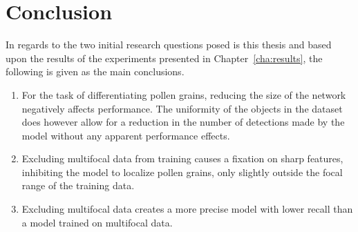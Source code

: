 \chapter{Conclusion}\label{cha:conclusion}


In regards to the two initial research questions posed is this thesis and based upon the results of the experiments presented in Chapter~\ref{cha:results}, the following is given as the main conclusions.

\begin{enumerate}
    \item For the task of differentiating pollen grains, reducing the size of the network negatively affects performance. The uniformity of the objects in the dataset does however allow for a reduction in the number of detections made by the model without any apparent performance effects.
    \item Excluding multifocal data from training causes a fixation on sharp features, inhibiting the model to localize pollen grains, only slightly outside the focal range of the training data.
    \item Excluding multifocal data creates a more precise model with lower recall than a model trained on multifocal data.
\end{enumerate}